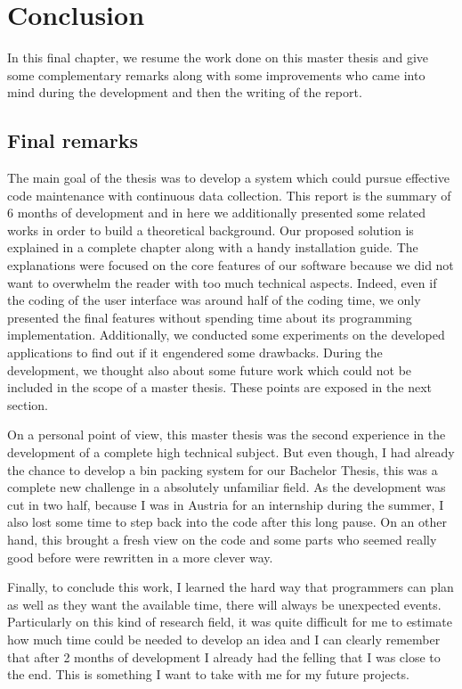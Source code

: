 \chapter{Conclusion} %
\label{chap:conclusion}

In this final chapter, we resume the work done on this master thesis and give some complementary remarks along with some improvements who came into mind during the development and then the writing of the report.

\section{Final remarks}
The main goal of the thesis was to develop a system which could pursue effective code maintenance with continuous data collection. This report is the summary of 6 months of development and in here we additionally presented some related works in order to build a theoretical background. Our proposed solution is explained in a complete chapter along with a handy installation guide. The explanations were focused on the core features of our software because we did not want to overwhelm the reader with too much technical aspects. Indeed, even if the coding of the user interface was around half of the coding time, we only presented the final features without spending time about its programming implementation.  Additionally, we conducted some experiments on the developed applications to find out if it engendered some drawbacks. During the development, we thought also about some future work which could not be included in the scope of a master thesis. These points are exposed in the next section.

On a personal point of view, this master thesis was the second experience in the development of a complete high technical subject. But even though, I had already the chance to develop a bin packing system for our Bachelor Thesis, this was a complete new challenge in a absolutely unfamiliar field. As the development was cut in two half, because I was in Austria for an internship during the summer, I also lost some time to step back into the code after this long pause. On an other hand, this brought a fresh view on the code and some parts who seemed really good before were rewritten in a more clever way.

Finally, to conclude this work, I learned the hard way that programmers can plan as well as they want the available time, there will always be unexpected events. Particularly on this kind of research field, it was quite difficult for me to estimate how much time could be needed to develop an idea and I can clearly remember that after 2 months of development I already had the felling that I was close to the end. This is something I want to take with me for my future projects.

